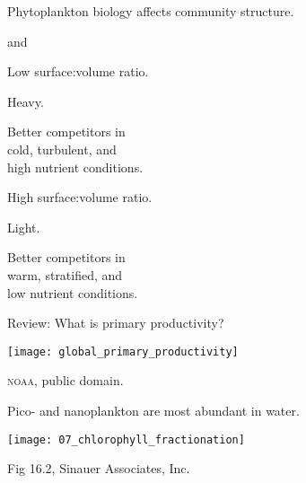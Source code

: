 \documentclass[t]{beamer}
\begin{document}
%
\begin{frame}[t]{Phytoplankton biology affects community structure.}

\begin{multicols}{2}

		\hangpara {} and 

		\hangpara Low surface:volume ratio.
		
		\hangpara Heavy.

		\hangpara Better competitors in \\
		\hspace*{1em}cold, turbulent, and \\
		\hspace*{1em}high nutrient conditions.
		
\columnbreak

		\hangpara {}

		\hangpara High surface:volume ratio.

		\hangpara Light.
		
		\hangpara Better competitors in \\
		\hspace*{1em} warm, stratified, and \\
		\hspace*{1em} low nutrient conditions.

\end{multicols}

\end{frame}
%
\begin{frame}[t]{Review: What is primary productivity?}

\begin{center}
	
	\vspace*{0.5\baselineskip}
	
	\texttt{[image: global\_primary\_productivity]}
	
	\vfilll
	
	\hfill \tiny \textsc{noaa}, public domain.
\end{center}

\end{frame}
%
\begin{frame}[t]{Pico- and nanoplankton are most abundant in  water.}

	\vspace*{-0.5\baselineskip}
	\begin{center}
		\texttt{[image: 07\_chlorophyll\_fractionation]}
	\end{center}
	\vfilll
	
\hfill \tiny Fig 16.2, \textcopyright Sinauer Associates, Inc.
\end{frame}
\end{document}
